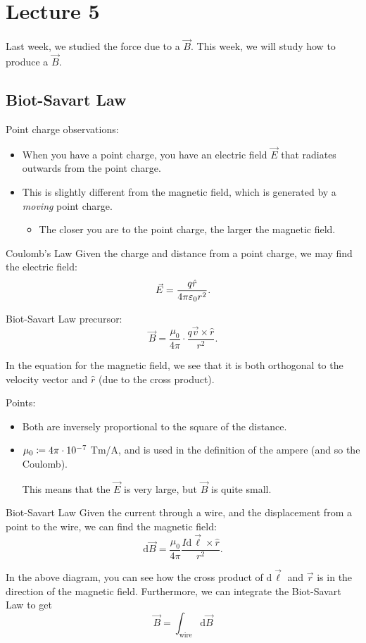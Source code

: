 \documentclass[class=article, crop=false]{standalone}
\begin{document}
  \section{Lecture 5}
  Last week, we studied the force due to a $\vec{B}$. This week, we will study how to produce a $\vec{B}$.
  \subsection{Biot-Savart Law}
  Point charge observations:
  \begin{itemize}
    \item When you have a point charge, you have an electric field $\vec{E}$ that radiates outwards from the point charge.
    \item This is slightly different from the magnetic field, which is generated by a \emph{moving} point charge.
    \begin{itemize}
      \item The closer you are to the point charge, the larger the magnetic field.
    \end{itemize}
  \end{itemize}
  \begin{theorem}{Coulomb's Law}
    Given the charge and distance from a point charge, we may find the electric field:
    \[
      \vec{E} = \frac{q\hat{r}}{4\pi\varepsilon_0r^2}.
    \]
  \end{theorem}
  Biot-Savart Law precursor:
  \[
    \vec{B} = \frac{\mu_0}{4\pi}\cdot \frac{q\vec{v}\times\hat{r}}{r^2}.
  \]
  \begin{note}{}
    In the equation for the magnetic field, we see that it is both orthogonal to the velocity vector and $\hat{r}$ (due to the cross product).
  \end{note}
  Points:
  \begin{itemize}
    \item Both are inversely proportional to the square of the distance.
    \item $\mu_0 \coloneqq 4\pi\cdot 10^{-7}$ Tm/A, and is used in the definition of the ampere (and so the Coulomb).
    \begin{note}{}
      This means that the $\vec{E}$ is very large, but $\vec{B}$ is quite small.
    \end{note}
  \end{itemize}
  \begin{theorem}{Biot-Savart Law}
    Given the current through a wire, and the displacement from a point to the wire, we can find the magnetic field:
    \[
      \mathrm{d}\vec{B} = \frac{\mu_0}{4\pi} \frac{I\mathrm{d}\vec{\ell}\times\hat{r}}{r^2}.
    \]
  \end{theorem}
  \begin{figure}[ht]
    \centering
  \end{figure}
  In the above diagram, you can see how the cross product of $\mathrm{d}\vec{\ell}$ and $\vec{r}$ is in the direction of the magnetic field. Furthermore, we can integrate the Biot-Savart Law to get
  \[
    \vec{B} = \int_\text{wire} \mathrm{d}\vec{B}
  \]
\end{document}
